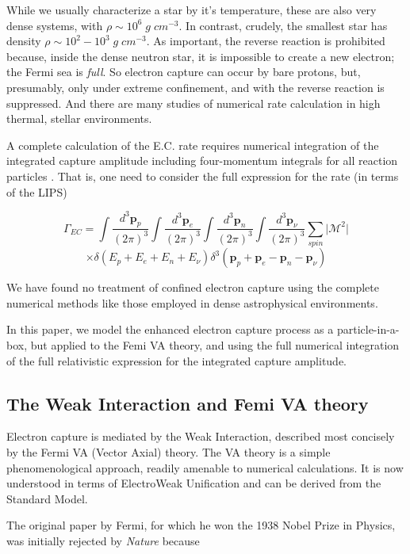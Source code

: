 \documentclass[%
 aip,
 jmp,%
 amsmath,amssymb,
 reprint,%
]{revtex4-1}
\begin{document}
While we usually characterize a star by it's temperature, these are also very dense systems, with $\rho\sim 10^6\;g\;cm^{-3}$.  In contrast, crudely, the smallest star has density $\rho\sim 10^{2}-10^{3}\;g\;cm^{-3}$.  As important, the reverse reaction is prohibited because, inside the dense neutron star, it is impossible to create a new electron; the Fermi sea is \emph{full}. So electron capture can occur by bare protons, but, presumably, only under extreme confinement, and with the reverse reaction is suppressed.   And there are many studies of numerical rate calculation in high thermal, stellar environments.   

A complete calculation of the E.C. rate requires numerical integration of  the integrated capture amplitude including four-momentum integrals for all reaction particles \cite{liu}. That is, one need to consider the full expression for the rate (in terms of the LIPS)

$$\Gamma_{EC}=\int\dfrac{d^{3}\mathbf{p}_{p}}{(2\pi)^{3}}\int\dfrac{d^{3}\mathbf{p}_{e}}{(2\pi)^{3}}\int\dfrac{d^{3}\mathbf{p}_{n}}{(2\pi)^{3}}\int\dfrac{d^{3}\mathbf{p}_{\nu}}{(2\pi)^{3}}\sum\limits_{spin}\vert\mathcal{M}^{2}\vert$$
$$\times\delta(E_{p}+E_{e}+E_{n}+E_{\nu})\delta^{3}(\mathbf{p}_{p}+\mathbf{p}_{e}-\mathbf{p}_{n}-\mathbf{p}_{\nu})$$

We have found no treatment of confined electron capture using the complete numerical methods like those employed in dense astrophysical environments.

In this paper, we model the enhanced electron capture process as a particle-in-a-box, but applied to the Femi VA theory, and using the full numerical integration of the full relativistic expression for the integrated capture amplitude.

\subsection{The Weak Interaction and Femi VA theory}

Electron capture is mediated by the Weak Interaction, described most concisely by the Fermi VA (Vector Axial) theory. \cite{fermi1,ec-review1,ec-review2}
The VA theory is a simple phenomenological approach, readily amenable to numerical calculations. It is now understood in terms of ElectroWeak Unification and can be derived from the Standard Model.  

The original paper by Fermi, for which he won the 1938 Nobel Prize in Physics, was initially rejected by \emph{Nature} because 
\end{document}
